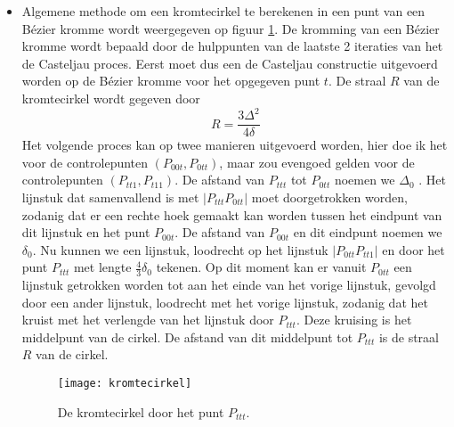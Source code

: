 \begin{itemize}
{\begin{itemize}
			\end{itemize}
		}
	{
		\begin{itemize} 
			\item Algemene methode om een kromtecirkel te berekenen in een punt van een Bézier kromme wordt weergegeven op figuur \ref{fig:kromtecirkel}. De kromming van een Bézier kromme wordt bepaald door de hulppunten van de laatste 2 iteraties van het de Casteljau proces. Eerst moet dus een de Casteljau constructie uitgevoerd worden op de Bézier kromme voor het opgegeven punt $t$. De straal $R$ van de kromtecirkel wordt gegeven door $$R = \frac{3\Delta^2}{4\delta}$$
			Het volgende proces kan op twee manieren uitgevoerd worden, hier doe ik het voor de controlepunten $(P_{00t}, P_{0tt})$, maar zou evengoed gelden voor de controlepunten $(P_{tt1}, P_{t11})$. De afstand van $P_{ttt}$ tot $P_{0tt}$ noemen we $\Delta_0$ . Het lijnstuk dat samenvallend is met $|P_{ttt}P_{0tt}|$ moet doorgetrokken worden, zodanig dat er een rechte hoek gemaakt kan worden tussen het eindpunt van dit lijnstuk en het punt $P_{00t}$. De afstand van $P_{00t}$ en dit eindpunt noemen we $\delta_0$. Nu kunnen we een lijnstuk, loodrecht op het lijnstuk $|P_{0tt}P_{tt1}|$ en door het punt $P_{ttt}$ met lengte $\frac{4}{3} \delta_0$ tekenen. Op dit moment kan er vanuit $P_{0tt}$ een lijnstuk getrokken worden tot aan het einde van het vorige lijnstuk, gevolgd door een ander lijnstuk, loodrecht met het vorige lijnstuk, zodanig dat het kruist met het verlengde van het lijnstuk door $P_{ttt}$. Deze kruising is het middelpunt van de cirkel. De afstand van dit middelpunt tot $P_{ttt}$ is de straal $R$ van de cirkel.
			
			\begin{figure}[ht]
				\centering
				\texttt{[image: kromtecirkel]}
				\caption{De kromtecirkel door het punt $P_{ttt}$.}
				\label{fig:kromtecirkel}
			\end{figure}
		\end{itemize}
			
		}
\end{itemize}

